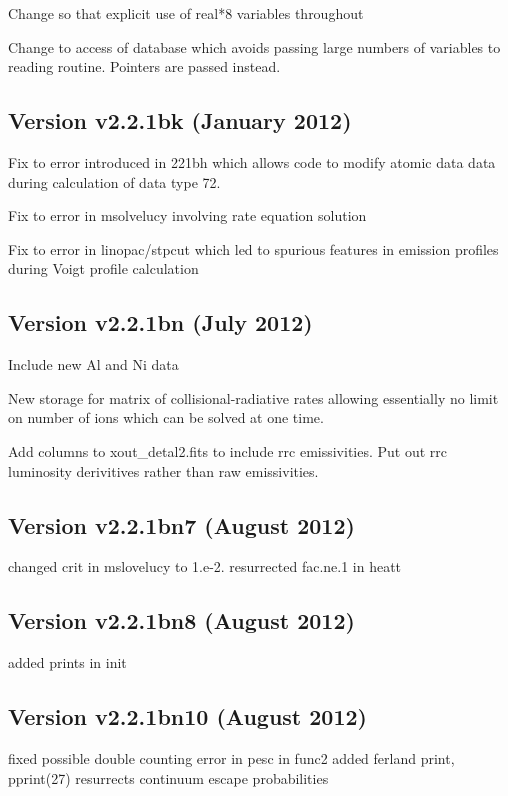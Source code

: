 Change  so that explicit use of real*8 variables throughout

Change to access of database which avoids passing large 
numbers of variables to reading routine.  Pointers are passed instead.

\subsection{Version v2.2.1bk (January 2012)}

Fix to error introduced in 221bh which allows code  to modify 
atomic data data during calculation of data type 72.

Fix to error in msolvelucy involving rate equation solution

Fix to error in linopac/stpcut which led to spurious features 
in emission profiles during Voigt profile calculation

\subsection{Version v2.2.1bn (July 2012)}

Include new Al and Ni data

New storage for matrix of collisional-radiative rates allowing essentially 
no limit on number of ions which can be solved at one time.

Add columns to xout\_detal2.fits to include rrc emissivities.
Put out rrc luminosity derivitives rather than raw emissivities.

\subsection{Version v2.2.1bn7 (August 2012)}

changed crit in mslovelucy to 1.e-2. resurrected fac.ne.1 in heatt

\subsection{Version v2.2.1bn8 (August 2012)}

added prints in init

\subsection{Version v2.2.1bn10 (August 2012)}

fixed possible double counting error in pesc in func2
         added ferland print, pprint(27)
         resurrects continuum escape probabilities

